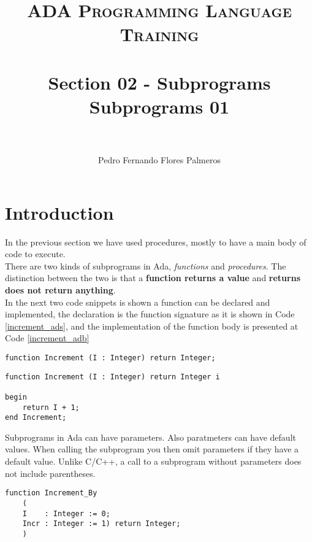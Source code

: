\documentclass[paper=a4, fontsize=11pt]{scrartcl} %
\title{	
\normalfont \normalsize 
\textsc{ADA Programming Language Training} \\ [25pt] %
\horrule{0.5pt} \\[0.4cm] %
\huge Section 02 - Subprograms \\ Subprograms 01\\ %
\horrule{2pt} \\[0.5cm] %
}
\author{Pedro Fernando Flores Palmeros} %
\date{} %
\numberwithin{equation}{section} %
\numberwithin{figure}{section} %
\numberwithin{table}{section} %
\begin{document}
\maketitle %
 

\section{Introduction}
In the previous section we have used procedures, mostly to have a main body of code to execute.\\

There are two kinds of subprograms in Ada, \textit{functions} and \textit{procedures}. The distinction between the two is that a \textbf{function returns a value} and \textbf{returns does not return anything}.\\

In the next two code snippets is shown a function can be declared and implemented, the declaration is the function signature as it is shown in Code \ref{increment_ads}, and the implementation of the function body is presented at Code \ref{increment_adb}

\begin{lstlisting}[caption = {increment.ads}, label = {increment_ads}]
function Increment (I : Integer) return Integer;
\end{lstlisting}

\begin{lstlisting}[caption = {increment.adb}, label = {increment_adb}]
function Increment (I : Integer) return Integer i

begin
	return I + 1; 
end Increment;
\end{lstlisting}

Subprograms in Ada can have parameters. Also paratmeters can have default values. When calling the subprogram you then omit parameters if they have a default value. Unlike C/C++, a call to a subprogram without parameters does not include parentheses.

\begin{lstlisting}[caption = {increment.adb}, label = {increment_by_ads}]
function Increment_By
	(
	I    : Integer := 0;
	Incr : Integer := 1) return Integer;
	)
\end{lstlisting}
\end{document}
